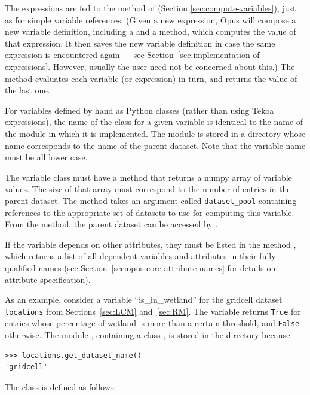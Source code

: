 The expressions are fed to the  method 
 of
 (Section \ref{sec:compute-variables}), just as for simple
variable references.  (Given a new expression, Opus will compose a
new variable definition, including a  and a
 method, which computes the value of that expression.
It then saves the new variable definition in case the same expression is
encountered again --- see Section~\ref{sec:implementation-of-expressions}.
However, usually the user need not
be concerned about this.)  The  method evaluates
each variable (or expression) in turn, and returns the value of the last one.

For variables defined by hand as Python classes (rather than using Tekoa expressions), the
name of the class for a given variable is identical to the name of the module 
in which it is implemented.
The module is stored in a directory whose name corresponds to the name of
the parent dataset. Note that the variable 
name must be all lower case.

The variable class must have a method  
that returns a numpy array of
variable values. The size of that array must correspond to the number of entries in the parent
dataset. The  method takes an argument called
\verb|dataset_pool| containing references to the appropriate set of datasets to
use for computing this variable. From the  method, the parent dataset can be
accessed  by .

If the variable depends on other attributes, they must be listed in the method
, which returns a list of all dependent variables and
attributes in their fully-qualified names (see
Section~\ref{sec:opus-core-attribute-names} for details on attribute
specification).

As an example, consider a variable ``is_in_wetland'' for the gridcell dataset
\verb|locations| from Sections~\ref{sec:LCM} and~\ref{sec:RM}. The variable
returns \verb|True| for entries whose percentage of wetland is more than a certain
threshold, and \verb|False| otherwise. The module ,
containing a class , is stored in the directory
 because
\begin{verbatim}
>>> locations.get_dataset_name()
'gridcell'
\end{verbatim}

The class is defined as follows:

